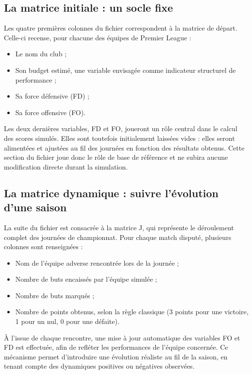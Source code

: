 \documentclass[12pt]{report}
\begin{document}
\subsection{La matrice initiale : un socle fixe}

Les quatre premières colonnes du fichier correspondent à la matrice de départ. Celle-ci recense, pour chacune des équipes de Premier League :\\
\begin{itemize}
  \item Le nom du club ;
  \item Son budget estimé, une variable envisagée comme indicateur structurel de performance ;
  \item Sa force défensive (FD) ;
  \item Sa force offensive (FO).\\
\end{itemize}


Les deux dernières variables, FD et FO, joueront un rôle central dans le calcul des scores simulés. Elles sont toutefois initialement laissées vides : elles seront alimentées et ajustées au fil des journées en fonction des résultats obtenus. Cette section du fichier joue donc le rôle de base de référence et ne subira aucune modification directe durant la simulation.

\subsection{La matrice dynamique : suivre l’évolution d’une saison}

La suite du fichier est consacrée à la matrice J, qui représente le déroulement complet des journées de championnat. Pour chaque match disputé, plusieurs colonnes sont renseignées :\\
\begin{itemize}
  \item Nom de l’équipe adverse rencontrée lors de la journée ;
  \item Nombre de buts encaissés par l’équipe simulée ;
  \item Nombre de buts marqués ;
  \item Nombre de points obtenus, selon la règle classique (3 points pour une victoire, 1 pour un nul, 0 pour une défaite).\\
\end{itemize}

À l’issue de chaque rencontre, une mise à jour automatique des variables FO et FD est effectuée, afin de refléter les performances de l’équipe concernée. Ce mécanisme permet d’introduire une évolution réaliste au fil de la saison, en tenant compte des dynamiques positives ou négatives observées.
\end{document}
